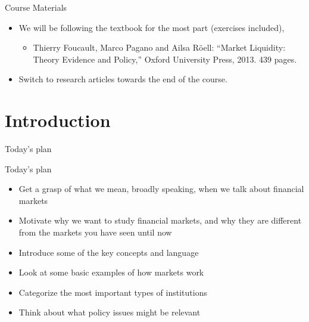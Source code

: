 \documentclass[english,10pt]{beamer}
\theoremstyle{definition}
\begin{document}
\begin{frame}{Course Materials}
\begin{itemize}
	\item We will be following the textbook for the most part (exercises included),
	\begin{itemize}
		\item Thierry Foucault, Marco Pagano and Ailsa R{\"o}ell: “Market Liquidity: Theory Evidence and Policy,” Oxford University Press, 2013. 439 pages.
	\end{itemize}
	\item Switch to research articles towards the end of the course.
\end{itemize}
\end{frame}




\section{Introduction}

\begin{frame}{Today's plan}
\tableofcontents[currentsection]
\end{frame}


\begin{frame}{Today's plan}
\begin{itemize}
	\item Get a grasp of what we mean, broadly speaking, when we talk about financial markets
	\item Motivate why we want to study financial markets, and why they are different from the markets you have seen until now
	\item Introduce some of the key concepts and language
	\item Look at some basic examples of how markets work
	\item Categorize the most important types of institutions
	\item Think about what policy issues might be relevant
\end{itemize}
\end{frame}
\end{document}
